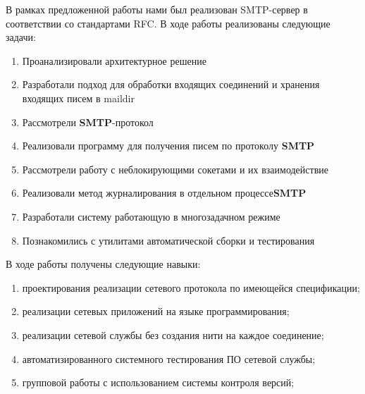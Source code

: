 \documentclass[a4paper,12pt]{report}
\begin{document}
В рамках предложенной работы нами был реализован SMTP-сервер в соответствии со стандартами RFC. В ходе работы реализованы следующие задачи: \\
\begin{enumerate}
	\item Проанализировали архитектурное решение
    \item Разработали подход для обработки входящих соединений и хранения входящих писем в maildir
    \item Рассмотрели \textbf{SMTP}-протокол
    \item Реализовали программу для получения писем по протоколу \textbf{SMTP}
    \item Рассмотрели работу с неблокирующими сокетами и их взаимодействие 
    \item Реализовали метод журналирования в отдельном процессе\textbf{SMTP}
    \item Разработали систему работающую в многозадачном режиме
    \item Познакомились с утилитами автоматической сборки и тестирования
\end{enumerate}
В ходе работы получены следующие навыки: \\
\begin{enumerate}
\item проектирования реализации сетевого протокола по имеющейся спецификации;
\item реализации сетевых приложений на языке программирования;
\item реализации сетевой службы без создания нити на каждое соединение;
\item автоматизированного системного тестирования ПО сетевой службы;
\item групповой работы с использованием системы контроля версий;
\end{enumerate}
\end{document}
